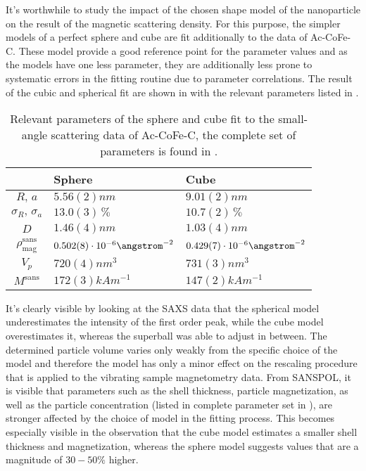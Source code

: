 
It's worthwhile to study the impact of the chosen shape model of the nanoparticle on the result of the magnetic scattering density.
For this purpose, the simpler models of a perfect sphere and cube are fit additionally to the data of Ac-CoFe-C.
These model provide a good reference point for the parameter values and as the models have one less parameter, they are additionally less prone to systematic errors in the fitting routine due to parameter correlations.
The result of the cubic and spherical fit are shown in  with the relevant parameters listed in .

\begin{table}[ht]
  \centering
  \caption{\label{tab:monolayers:nanoparticle:sasSphereCubeFit}Relevant parameters of the sphere and cube fit to the small-angle scattering data of Ac-CoFe-C, the complete set of parameters is found in .}
  \begin{tabular}{ c | l | l }
      & Sphere & Cube \\
    \hline
    $R, \, a$
      & $5.56(2) \unit{nm}$
      & $9.01(2) \unit{nm}$\\
    $\sigma_R, \, \sigma_a$
      & $13.0(3) \,\%$
      & $10.7(2) \,\%$\\
    $D$
      & $1.46(4) \unit{nm}$
      & $1.03(4) \unit{nm}$\\
    $\rho_\mathrm{mag}^\mathrm{sans}$
      & $0.502(8) \cdot 10^{-6} \angstrom^{-2}$
      & $0.429(7) \cdot 10^{-6} \angstrom^{-2}$\\
    \hline
    $V_p$
      & $720(4) \unit{nm^{3}}$
      & $731(3) \unit{nm^{3}}$\\
    $M^\mathrm{sans}$
      & $172(3) \unit{kAm^{-1}}$
      & $147(2) \unit{kAm^{-1}}$\\
    \hline
  \end{tabular}
\end{table}

It's clearly visible by looking at the SAXS data that the spherical model underestimates the intensity of the first order peak, while the cube model overestimates it, whereas the superball was able to adjust in between.
The determined particle volume varies only weakly from the specific choice of the model and therefore the model has only a minor effect on the rescaling procedure that is applied to the vibrating sample magnetometry data.
From SANSPOL, it is visible that parameters such as the shell thickness, particle magnetization, as well as the particle concentration (listed in complete parameter set in ), are stronger affected by the choice of model in the fitting process.
This becomes especially visible in the observation that the cube model estimates a smaller shell thickness and magnetization, whereas the sphere model suggests values that are a magnitude of $30 - 50 \unit{\%}$ higher.

